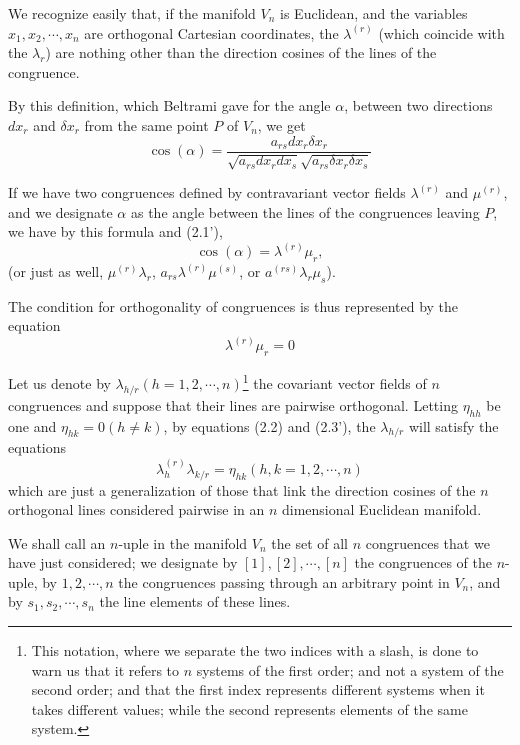 \documentclass{book}
\begin{document}
We recognize easily that, if the manifold $V_n$ is Euclidean, and the variables $x_1,x_2,\cdots,x_n$ are orthogonal Cartesian coordinates, the $\lambda^{(r)}$ (which coincide with the $\lambda_r$) are nothing other than the direction cosines of the lines of the congruence. 

By this definition, which Beltrami gave for the angle $\alpha$, between two directions $dx_r$ and $\delta x_r$ from the same point $P$ of $V_n$, we get
$$\cos(\alpha)=\frac{a_{rs}dx_r\delta x_r}{\sqrt{a_{rs}dx_rdx_s}\sqrt{a_{rs}\delta x_r\delta x_s}}$$

If we have two congruences defined by contravariant vector fields $\lambda^{(r)}$ and $\mu^{(r)}$, and we designate $\alpha$ as the angle between the lines of the congruences leaving $P$, we have by this formula and (2.1'),
\begin{equation}
\cos(\alpha)=\lambda^{(r)}\mu_r,
\end{equation}
(or just as well, $\mu^{(r)}\lambda_r$, $a_{rs}\lambda^{(r)}\mu^{(s)}$, or $a^{(rs)}\lambda_r\mu_s$).

The condition for orthogonality of congruences is thus represented by the equation
\begin{equation*}
\tag{2.3'}
\lambda^{(r)}\mu_r=0
\end{equation*}

Let us denote by $\lambda_{h/r} (h=1,2,\cdots,n)$\footnote{This notation, where we separate the two indices with a slash, is done to warn us that it refers to $n$ systems of the first order; and not a system of the second order; and that the first index represents different systems when it takes different values; while the second represents elements of the same system.} the covariant vector fields of $n$ congruences and suppose that their lines are pairwise orthogonal. Letting $\eta_{hh}$ be one and $\eta_{hk}=0 (h\neq k)$, by equations (2.2) and (2.3'), the $\lambda_{h/r}$ will satisfy the equations
\begin{equation}
\lambda_h^{(r)}\lambda_{k/r}=\eta_{hk} (h,k=1,2,\cdots, n)
\end{equation}
which are just a generalization of those that link the direction cosines of the $n$ orthogonal lines considered pairwise in an $n$ dimensional Euclidean manifold.

We shall call an $n$-uple in the manifold $V_n$ the set of all $n$ congruences that we have just considered; we designate by $[1],[2],\cdots,[n]$ the congruences of the $n$-uple, by $1,2,\cdots,n$ the congruences passing through an arbitrary point in $V_n$, and by $s_1,s_2,\cdots,s_n$ the line elements of these lines.
\end{document}
